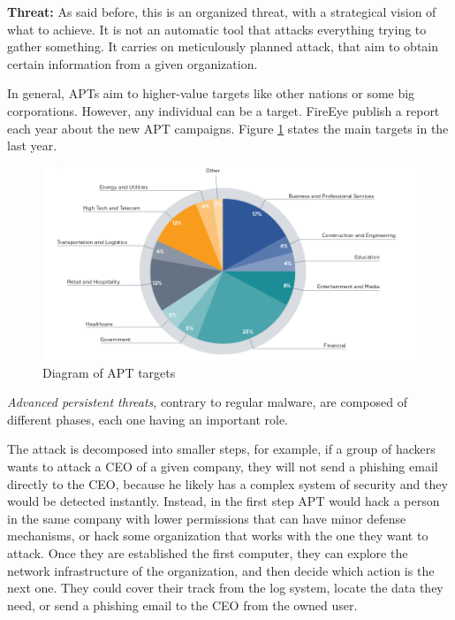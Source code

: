 \textbf{Threat:} As said before, this is an organized threat, with a strategical vision of what to achieve. It is not an automatic tool that attacks everything trying to gather something. It carries on meticulously planned attack, that aim to obtain certain information from a given organization. 

In general, APTs aim to higher-value targets like other nations or some big corporations. However, any individual can be a target. FireEye publish a report each year about the new APT campaigns. Figure \ref{fig:diag} states the main targets in the last year.\\

\begin{figure}[!h]
	\centering
	\includegraphics[width=1.0\columnwidth]{graph}
	\caption{Diagram of APT targets}
	\label{fig:diag}
\end{figure}





\textit{Advanced persistent threats}, contrary to regular malware, are composed of different phases, each one having an important role. 

The attack is decomposed into smaller steps, for example, if a group of hackers wants to attack a CEO of a given company, they will not send a phishing email directly to the CEO, because he likely has a complex system of security and they would be detected instantly. 
Instead, in the first step APT would hack a person in the same company with lower permissions that can have minor defense mechanisms, or hack some organization that works with the one they want to attack. Once they are established the first computer, they can explore the network infrastructure of the organization, and then decide which action is the next one.
They could cover their track from the log system, locate the data they need, or send a phishing email to the CEO from the owned user.

